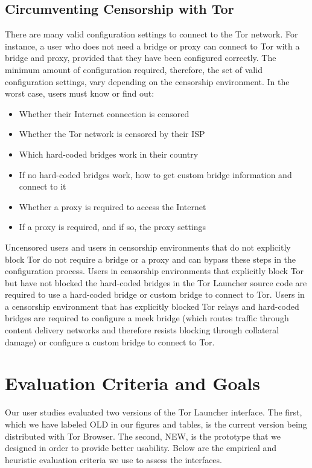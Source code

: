 \documentclass[USenglish,oneside,twocolumn]{article}
\begin{document}
\subsection{Circumventing Censorship with Tor}
There are many valid configuration settings to connect to the Tor network.
For instance, a user who does not need a bridge or proxy 
can connect to Tor with a bridge and proxy, provided that they have been configured correctly. 
The minimum amount of configuration required, therefore, the set of valid configuration settings,
vary depending on the censorship environment. In the worst case, users must know or find out:\\

\begin{itemize}
	\item{Whether their Internet connection is censored} 
	\item{Whether the Tor network is censored by their ISP}
	\item{Which hard-coded bridges work in their country} 
	\item{If no hard-coded bridges work, how to get custom bridge information and connect to it} 
	\item{Whether a proxy is required to access the Internet}
	\item{If a proxy is required, and if so, the proxy settings}
\end{itemize}

Uncensored users and users in censorship environments that do not explicitly 
block Tor do not require a bridge or a proxy and can bypass these steps in the configuration process.
Users in censorship environments that explicitly block Tor but have not blocked the 
hard-coded bridges in the Tor Launcher source code are required to use a 
hard-coded bridge or custom bridge to connect to Tor. Users in a censorship environment that has explicitly 
blocked Tor relays and hard-coded bridges are required to configure a meek bridge (which 
routes traffic through content delivery networks and therefore resists blocking through collateral damage) or 
configure a custom bridge to connect to Tor.


\section{Evaluation Criteria and Goals}
\label{sec:goals}
Our user studies evaluated two versions of the Tor Launcher interface.
The first, which we have labeled OLD in our figures and tables,
is the current version being distributed with Tor Browser.
The second, NEW, is the prototype that we designed
in order to provide better usability. Below are the empirical and 
heuristic evaluation criteria we use to assess the interfaces. 
\end{document}
